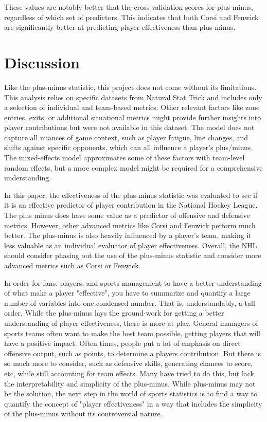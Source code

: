 \documentclass[12pt]{article}
\begin{document}
These values are notably better that the cross validation scores for plus-minus, regardless of which set of predictors. This indicates
that both Corsi and Fenwick are significantly better at predicting player effectiveness than plus-minus.


\section{Discussion}
\label{sec:disc}

Like the plus-minus statistic, this project does not come without its limitations. This analysis relies on specific datasets from 
Natural Stat Trick and includes only a selection of individual and team-based metrics. Other relevant factors like zone entries, exits, or 
additional situational metrics might provide further insights into player contributions but were not available in this dataset. The model 
does not capture all nuances of game context, such as player fatigue, line changes, and shifts against specific opponents, which can all 
influence a player’s plus/minus. The mixed-effects model approximates some of these factors with team-level random effects, but a more 
complex model might be required for a comprehensive understanding.

In this paper, the effectiveness of the plus-minus statistic was evaluated to see if it is an effective predictor of player contribution
in the National Hockey League. The plus minus does have some value as a predictor of offensive and defensive metrics. However, other
advanced metrics like Corsi and Fenwick perform much better. The plus-minus is also heavily influenced by a player's team, making it 
less valuable as an individual evaluator of player effectiveness. Overall, the NHL should consider phasing out the use of the plus-minus
statistic and consider more advanced metrics such as Corsi or Fenwick.

In order for fans, players, and sports management to have a better understanding of what make a player "effective", you have to 
summarize and quantify a large number of variables into one condensed number. That is, understandably, a tall order. While the plus-minus
lays the ground-work for getting a better understanding of player effectiveness, there is more at play. General managers of sports teams
often want to make the best team possible, getting players that will have a positive impact. Often times, people put a lot of emphasis on
direct offensive output, such as points, to determine a players contribution. But there is so much more to consider, such as defensive skills,
generating chances to score, etc, while still accounting for team effects. Many have tried to do this, but lack the interpretability and 
simplicity of the plus-minus. While plus-minus may not be the solution, the next step in the world of sports statistics is to find a way to 
quantify the concept of "player effectiveness" in a way that includes the simplicity of the plus-minus without its controversial nature.



\end{document}
